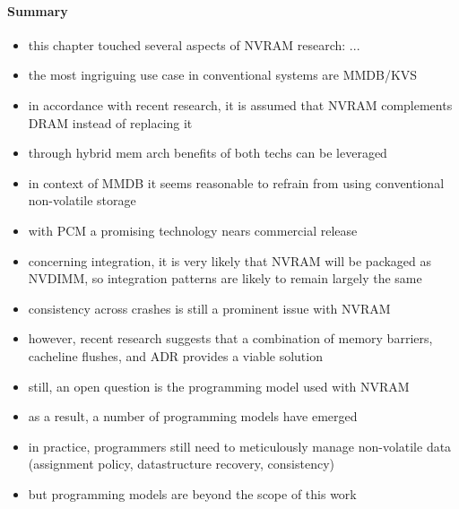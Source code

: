 
\paragraph{Summary}

\begin{itemize}
    \item this chapter touched several aspects of NVRAM research: ...
    \item the most ingriguing use case in conventional systems are MMDB/KVS
    \item in accordance with recent research, it is assumed that NVRAM complements DRAM instead of replacing it
    \item through hybrid mem arch benefits of both techs can be leveraged
    \item in context of MMDB it seems reasonable to refrain from using conventional non-volatile storage
    \item with PCM a promising technology nears commercial release
    \item concerning integration, it is very likely that NVRAM will be packaged as NVDIMM, so integration patterns are likely to remain largely the same
    \item consistency across crashes is still a prominent issue with NVRAM
    \item however, recent research suggests that a combination of memory barriers, cacheline flushes, and ADR provides a viable solution
    \item still, an open question is the programming model used with NVRAM
    \item as a result, a number of programming models have emerged
    \item in practice, programmers still need to meticulously manage non-volatile data (assignment policy, datastructure recovery, consistency)
    \item but programming models are beyond the scope of this work
\end{itemize}
